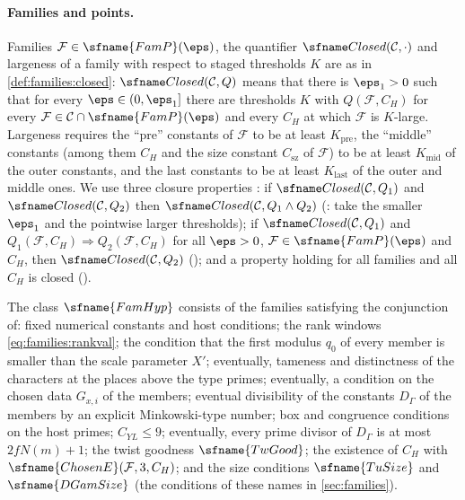 \paragraph{Families and points.}
Families $\mathcal F\in\sfname{FamP}(\eps)$, the quantifier $\ontothreeClosed(\mathcal C,\cdot)$ and largeness of
a family with respect to staged thresholds $K$ are as in \cref{def:families:closed}: $\ontothreeClosed(\mathcal
C,Q)$ means that there is $\eps_1>0$ such that for every $\eps\in(0,\eps_1]$ there are thresholds $K$ with
$Q(\mathcal F,C_H)$ for every $\mathcal F\in\mathcal C\cap\sfname{FamP}(\eps)$ and every $C_H$ at which
$\mathcal F$ is $K$-large. Largeness requires the ``pre'' constants of $\mathcal F$ to be at least $K_{\mathrm{pre}}$,
the ``middle'' constants (among them $C_H$ and the size constant $C_{\mathrm{sz}}$ of $\mathcal F$) to be at least
$K_{\mathrm{mid}}$ of the outer constants, and the last constants to be at least $K_{\mathrm{last}}$ of the outer and
middle ones. We use three closure properties \cite{LeanSource2026}: if $\ontothreeClosed(\mathcal C,Q_1)$ and
$\ontothreeClosed(\mathcal C,Q_2)$ then $\ontothreeClosed(\mathcal C,Q_1\wedge Q_2)$
(: take the smaller $\eps_1$ and the pointwise larger thresholds);
if $\ontothreeClosed(\mathcal C,Q_1)$ and $Q_1(\mathcal F,C_H)\Rightarrow Q_2(\mathcal F,C_H)$ for all
$\eps>0$, $\mathcal F\in\sfname{FamP}(\eps)$ and $C_H$, then $\ontothreeClosed(\mathcal C,Q_2)$
(); and a property holding for all families and all $C_H$ is closed
().

The class $\sfname{FamHyp}$ consists of the families satisfying the conjunction of: fixed numerical constants
and host conditions; the rank windows \eqref{eq:families:rankval}; the condition that the first modulus $q_0$ of
every member is smaller than the scale parameter $X'$; eventually, tameness and distinctness of the characters at the
places above the type primes; eventually, a condition on the chosen data $G_{x,i}$ of the members; eventual
divisibility of the constants $D_\Gamma$ of the members by an explicit Minkowski-type number; box and congruence
conditions on the host primes; $C_{YL}\le9$; eventually, every prime divisor of $D_\Gamma$ is at most $2fN(m)+1$;
the twist goodness $\sfname{TwGood}$; the existence of $C_H$ with $\sfname{ChosenE}(\mathcal F,3,C_H)$; and the size
conditions $\sfname{TuSize}$ and $\sfname{DGamSize}$ (the conditions of these names in \cref{sec:families}).


